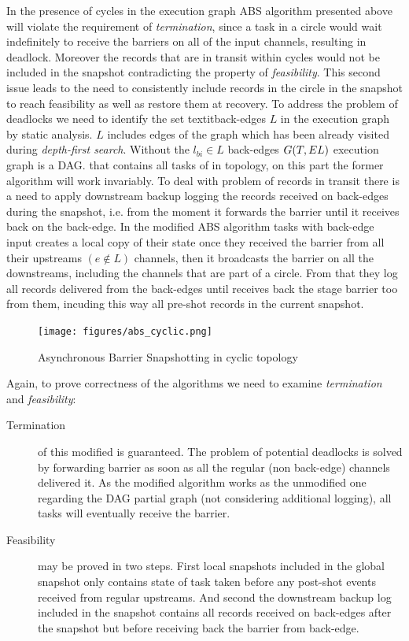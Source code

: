 \cite{abs}
In the presence of cycles in the execution graph ABS algorithm presented above will violate the requirement of \textit{termination}, since a task in a circle would wait indefinitely to receive the barriers on all of the input channels, resulting in deadlock. Moreover the records that are in transit within cycles would not be included in the snapshot contradicting the property of \textit{feasibility}. This second issue leads to the need to consistently include records in the circle in the snapshot to reach feasibility as well as restore them at recovery.
To address the problem of deadlocks we need to identify the set textit{back-edges} $L$  in the execution graph by static analysis. $L$ includes edges of the graph which has been already visited during \textit{depth-first search}. Without the $l_{bi} \in L$ back-edges $G(T, E\\L)$ execution graph is a DAG. that contains all tasks of in topology, on this part the former algorithm will work invariably. To deal with problem of records in transit there is a need to apply downstream backup logging the records received on back-edges during the snapshot, i.e. from the moment it forwards the barrier until it receives back on the back-edge.      
In the modified ABS algorithm  tasks with back-edge input creates a local copy of their state once they received the barrier from all their upstreams $(e \notin L)$ channels, then it broadcasts the barrier on all the downstreams, including the channels that are part of a circle. From that they log all records delivered from the back-edges until receives back the stage barrier too from them, incuding this way all pre-shot records in the current snapshot.  
\begin{figure}[!ht]
  \centering    
      \texttt{[image: figures/abs\_cyclic.png]}
  \caption{Asynchronous Barrier Snapshotting in cyclic topology\cite{abs}}
  \label{fig:abs_cyclic}
\end{figure}
Again, to prove correctness of the algorithms we need to examine \textit{termination} and \textit{feasibility}:
\begin{description}

\item[Termination] of this modified is guaranteed. The problem of potential deadlocks is solved by forwarding barrier as soon as all the regular (non back-edge) channels delivered it. As the modified algorithm works as the unmodified one regarding the DAG partial graph (not considering additional logging), all tasks will eventually receive the barrier.
\item[Feasibility] may be proved in two steps. First local snapshots included in the global snapshot only contains state of task taken before any post-shot events received from regular upstreams. And second the downstream backup log included in the snapshot contains all records received on back-edges after the snapshot but before receiving back the barrier from back-edge.
\end{description} 
\cite{abs}


